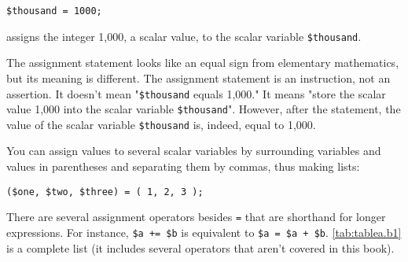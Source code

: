 \begin{lstlisting}
$thousand = 1000;
\end{lstlisting}

assigns the integer 1,000, a scalar value, to the scalar variable \verb|$thousand|.

The assignment statement looks like an equal sign from elementary mathematics, but its meaning is different. The assignment statement is an instruction, not an assertion. It doesn't mean "\verb|$thousand| equals 1,000." It means "store the scalar value 1,000 into the scalar variable \verb|$thousand|". However, after the statement, the value of the scalar variable \verb|$thousand| is, indeed, equal to 1,000.

You can assign values to several scalar variables by surrounding variables and values in parentheses and separating them by commas, thus making lists:

\begin{lstlisting}
($one, $two, $three) = ( 1, 2, 3 );
\end{lstlisting}

There are several assignment operators besides \verb|=| that are shorthand for longer expressions. For instance, \verb|$a += $b| is equivalent to \verb|$a = $a + $b|. \autoref{tab:tablea.b1} is a complete list (it includes several operators that aren't covered in this book).


